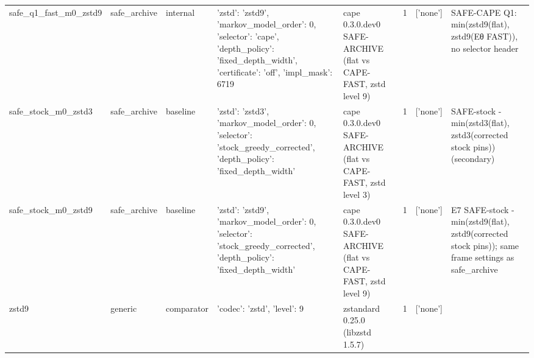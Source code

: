 \begin{table}[t]
\begin{tabular}{llllllll}
safe\_q1\_fast\_m0\_zstd9 & safe\_archive & internal & {'zstd': 'zstd9', 'markov\_model\_order': 0, 'selector': 'cape', 'depth\_policy': 'fixed\_depth\_width', 'certificate': 'off', 'impl\_mask': 6719} & cape 0.3.0.dev0 SAFE-ARCHIVE (flat vs CAPE-FAST, zstd level 9) & 1 & ['none'] & SAFE-CAPE Q1: min(zstd9(flat), zstd9(Eθ FAST)), no selector header \\
safe\_stock\_m0\_zstd3 & safe\_archive & baseline & {'zstd': 'zstd3', 'markov\_model\_order': 0, 'selector': 'stock\_greedy\_corrected', 'depth\_policy': 'fixed\_depth\_width'} & cape 0.3.0.dev0 SAFE-ARCHIVE (flat vs CAPE-FAST, zstd level 3) & 1 & ['none'] & SAFE-stock - min(zstd3(flat), zstd3(corrected stock pins)) (secondary) \\
safe\_stock\_m0\_zstd9 & safe\_archive & baseline & {'zstd': 'zstd9', 'markov\_model\_order': 0, 'selector': 'stock\_greedy\_corrected', 'depth\_policy': 'fixed\_depth\_width'} & cape 0.3.0.dev0 SAFE-ARCHIVE (flat vs CAPE-FAST, zstd level 9) & 1 & ['none'] & E7 SAFE-stock - min(zstd9(flat), zstd9(corrected stock pins)); same frame settings as safe\_archive \\
zstd9 & generic & comparator & {'codec': 'zstd', 'level': 9} & zstandard 0.25.0 (libzstd 1.5.7) & 1 & ['none'] &  \\
\hline
\end{tabular}
\end{table}
